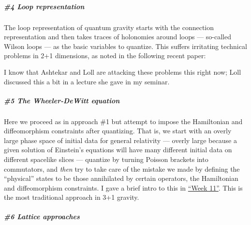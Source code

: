 \documentclass[12pt]{article}
\def\tightlist{}
\renewcommand{\texttt}[1]{%
  \begingroup
  \ttfamily
  \begingroup\lccode`~=`/\lowercase{\endgroup\def~}{/\discretionary{}{}{}}%
  \begingroup\lccode`~=`[\lowercase{\endgroup\def~}{[\discretionary{}{}{}}%
  \begingroup\lccode`~=`.\lowercase{\endgroup\def~}{.\discretionary{}{}{}}%
  \catcode`/=\active\catcode`[=\active\catcode`.=\active
  \scantokens{#1\noexpand}%
  \endgroup
}
\begin{document}
\hypertarget{loop-representation}{%
\subparagraph{\#4 Loop representation}\label{loop-representation}}

The loop representation of quantum gravity starts with the connection
representation and then takes traces of holonomies around loops ---
so-called Wilson loops --- as the basic variables to quantize. This
suffers irritating technical problems in 2+1 dimensions, as noted in the
following recent paper:

\noindent
I know that Ashtekar and Loll are attacking these problems this right
now; Loll discussed this a bit in a lecture she gave in my seminar.

\hypertarget{the-wheeler-dewitt-equation}{%
\subparagraph{\#5 The Wheeler-DeWitt
equation}\label{the-wheeler-dewitt-equation}}

Here we proceed as in approach \#1 but attempt to impose the Hamiltonian
and diffeomorphism constraints after quantizing. That is, we start with
an overly large phase space of initial data for general relativity ---
overly large because a given solution of Einstein's equations will have
many different initial data on different spacelike slices --- quantize
by turning Poisson brackets into commutators, and \emph{then} try to take care
of the mistake we made by defining the ``physical'' states to be those
annihilated by certain operators, the Hamiltonian and diffeomorphism
constraints. I gave a brief intro to this in
\protect\hyperlink{week11}{``Week 11''}. This is the most traditional
approach in 3+1 gravity.

\hypertarget{lattice-approaches}{%
\subparagraph{\#6 Lattice approaches}\label{lattice-approaches}}
\end{document}

